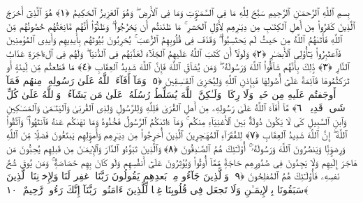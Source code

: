 
  
    
  
    
    

\nopagebreak
  بِسمِ ٱللَّهِ ٱلرَّحمَـٰنِ ٱلرَّحِيمِ
  سَبَّحَ لِلَّهِ مَا فِى ٱلسَّمَـٰوَٟتِ وَمَا فِى ٱلأَرضِ ۖ وَهُوَ ٱلعَزِيزُ ٱلحَكِيمُ ﴿١﴾
 هُوَ ٱلَّذِىٓ أَخرَجَ ٱلَّذِينَ كَفَرُوا۟ مِن أَهلِ ٱلكِتَـٰبِ مِن دِيَـٰرِهِم لِأَوَّلِ ٱلحَشرِ ۚ مَا ظَنَنتُم أَن يَخرُجُوا۟ ۖ وَظَنُّوٓا۟ أَنَّهُم مَّانِعَتُهُم حُصُونُهُم مِّنَ ٱللَّهِ فَأَتَىٰهُمُ ٱللَّهُ مِن حَيثُ لَم يَحتَسِبُوا۟ ۖ وَقَذَفَ فِى قُلُوبِهِمُ ٱلرُّعبَ ۚ يُخرِبُونَ بُيُوتَهُم بِأَيدِيهِم وَأَيدِى ٱلمُؤمِنِينَ فَٱعتَبِرُوا۟ يَـٰٓأُو۟لِى ٱلأَبصَـٰرِ ﴿٢﴾
 وَلَولَآ أَن كَتَبَ ٱللَّهُ عَلَيهِمُ ٱلجَلَآءَ لَعَذَّبَهُم فِى ٱلدُّنيَا ۖ وَلَهُم فِى ٱلءَاخِرَةِ عَذَابُ ٱلنَّارِ ﴿٣﴾
 ذَٟلِكَ بِأَنَّهُم شَآقُّوا۟ ٱللَّهَ وَرَسُولَهُۥ ۖ وَمَن يُشَآقِّ ٱللَّهَ فَإِنَّ ٱللَّهَ شَدِيدُ ٱلعِقَابِ ﴿٤﴾
 مَا قَطَعتُم مِّن لِّينَةٍ أَو تَرَكتُمُوهَا قَآئِمَةً عَلَىٰٓ أُصُولِهَا فَبِإِذنِ ٱللَّهِ وَلِيُخزِىَ ٱلفَـٰسِقِينَ ﴿٥﴾
 وَمَآ أَفَآءَ ٱللَّهُ عَلَىٰ رَسُولِهِۦ مِنهُم فَمَآ أَوجَفتُم عَلَيهِ مِن خَيلٍۢ وَلَا رِكَابٍۢ وَلَـٰكِنَّ ٱللَّهَ يُسَلِّطُ رُسُلَهُۥ عَلَىٰ مَن يَشَآءُ ۚ وَٱللَّهُ عَلَىٰ كُلِّ شَىءٍۢ قَدِيرٌۭ ﴿٦﴾
 مَّآ أَفَآءَ ٱللَّهُ عَلَىٰ رَسُولِهِۦ مِن أَهلِ ٱلقُرَىٰ فَلِلَّهِ وَلِلرَّسُولِ وَلِذِى ٱلقُربَىٰ وَٱليَتَـٰمَىٰ وَٱلمَسَـٰكِينِ وَٱبنِ ٱلسَّبِيلِ كَى لَا يَكُونَ دُولَةًۢ بَينَ ٱلأَغنِيَآءِ مِنكُم ۚ وَمَآ ءَاتَىٰكُمُ ٱلرَّسُولُ فَخُذُوهُ وَمَا نَهَىٰكُم عَنهُ فَٱنتَهُوا۟ ۚ وَٱتَّقُوا۟ ٱللَّهَ ۖ إِنَّ ٱللَّهَ شَدِيدُ ٱلعِقَابِ ﴿٧﴾
 لِلفُقَرَآءِ ٱلمُهَـٰجِرِينَ ٱلَّذِينَ أُخرِجُوا۟ مِن دِيَـٰرِهِم وَأَموَٟلِهِم يَبتَغُونَ فَضلًۭا مِّنَ ٱللَّهِ وَرِضوَٟنًۭا وَيَنصُرُونَ ٱللَّهَ وَرَسُولَهُۥٓ ۚ أُو۟لَـٰٓئِكَ هُمُ ٱلصَّـٰدِقُونَ ﴿٨﴾
 وَٱلَّذِينَ تَبَوَّءُو ٱلدَّارَ وَٱلإِيمَـٰنَ مِن قَبلِهِم يُحِبُّونَ مَن هَاجَرَ إِلَيهِم وَلَا يَجِدُونَ فِى صُدُورِهِم حَاجَةًۭ مِّمَّآ أُوتُوا۟ وَيُؤثِرُونَ عَلَىٰٓ أَنفُسِهِم وَلَو كَانَ بِهِم خَصَاصَةٌۭ ۚ وَمَن يُوقَ شُحَّ نَفسِهِۦ فَأُو۟لَـٰٓئِكَ هُمُ ٱلمُفلِحُونَ ﴿٩﴾
 وَٱلَّذِينَ جَآءُو مِنۢ بَعدِهِم يَقُولُونَ رَبَّنَا ٱغفِر لَنَا وَلِإِخوَٟنِنَا ٱلَّذِينَ سَبَقُونَا بِٱلإِيمَـٰنِ وَلَا تَجعَل فِى قُلُوبِنَا غِلًّۭا لِّلَّذِينَ ءَامَنُوا۟ رَبَّنَآ إِنَّكَ رَءُوفٌۭ رَّحِيمٌ ﴿١٠﴾

